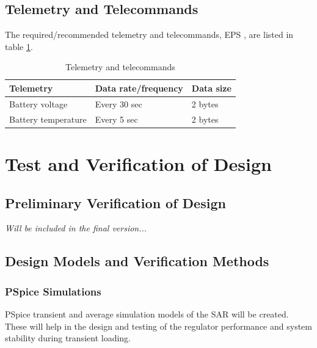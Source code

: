 \subsection{Telemetry and Telecommands}
%
The required/recommended telemetry and telecommands, \ac{EPS} , are listed in table \ref{tab:Telemetry_Telecommands}.
%
\begin{table}[H]
\centering
\caption{Telemetry and telecommands}
\label{tab:Telemetry_Telecommands}
\begin{tabular}{|l|l|l|}
\hline
\textbf{Telemetry} & \textbf{Data rate/frequency} & \textbf{Data size} \\
\hline
Battery voltage & Every 30 sec & 2 bytes\\
\hline
Battery temperature & Every 5 sec & 2 bytes\\
\hline
\end{tabular}
\end{table}

\section{Test and Verification of Design}
\label{sec:test_verification}

\subsection{Preliminary Verification of Design}

\textit{Will be included in the final version...}

\subsection{Design Models and Verification Methods}

\subsubsection*{PSpice Simulations}
PSpice transient and average simulation models of the \ac{SAR} will be created. These will help in the design and testing of the regulator performance and system stability during transient loading.

